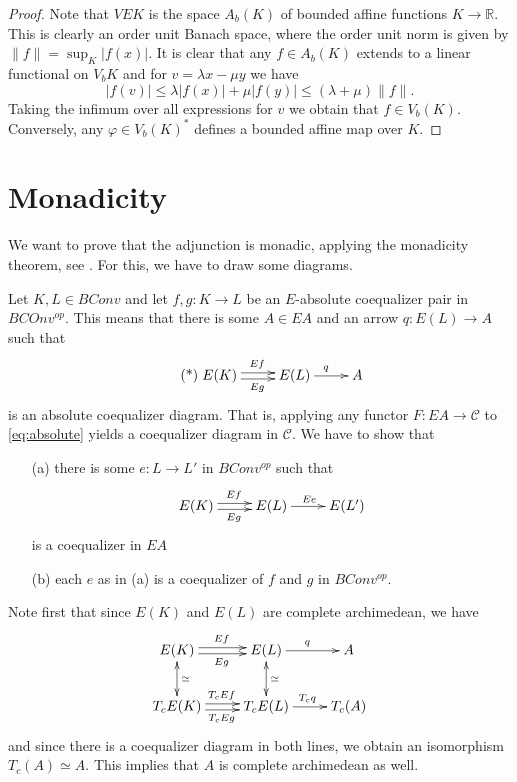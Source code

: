 \documentclass[12pt]{article}
\begin{document}
\begin{proof} Note that $VEK$ is the space $A_b(K)$ of bounded affine functions $K\to \mathbb R$. This is clearly an order unit Banach space, where the order unit norm is given by $\|f\|=\sup_K|f(x)|$. It is clear that any $f\in A_b(K)$ 
extends to a linear functional on $V_bK$ and for $v=\lambda x-\mu y$ we have
\[
|f(v)|\le \lambda|f(x)|+\mu|f(y)|\le (\lambda+\mu)\|f\|.
\]
Taking the infimum over all expressions for $v$ we obtain that $f\in V_b(K)$. Conversely, any $\varphi\in V_b(K)^*$ defines a 
 bounded affine map over $K$.

\end{proof}

\section{Monadicity}

We want to prove that the adjunction is monadic, applying the monadicity theorem, see \cite{leinster}. For this, we have to draw some diagrams.

Let $K,L\in BConv$ and let $f,g:K\to L$ be an $E$-absolute coequalizer pair in $BCOnv^{op}$. This means that there is some $A\in EA$ and an arrow $q:E(L)\to A$ such that
\begin{equation}\label{eq:absolute}\tag{*}
\xymatrix{
E(K) \ar@<.5ex>[r]^{Ef} \ar@<-.5ex>[r]_{Eg} &E(L)\ar[r]^q & A}
\end{equation}
is an absolute coequalizer diagram. That is, applying any functor $F: EA\to \mathcal C$ to \eqref{eq:absolute} yields a coequalizer diagram in $\mathcal C$. We have to show that
\begin{enumerate}
\item[(a)] there is some $e: L\to L'$ in $BConv^{op}$ such that 
\begin{equation}
\xymatrix{
E(K) \ar@<.5ex>[r]^{Ef} \ar@<-.5ex>[r]_{Eg} &E(L)\ar[r]^{Ee} & E(L')}
\end{equation}
is a coequalizer in $EA$
\item[(b)] each $e$ as in (a) is a coequalizer of $f$ and $g$ in $BConv^{op}$.
\end{enumerate}

Note first that since $E(K)$ and $E(L)$ are complete archimedean, we have 
\[
\xymatrix{
E(K) \ar@<.5ex>[r]^{Ef} \ar@<-.5ex>[r]_{Eg} \ar@{<->}^{\simeq}[d]&E(L)\ar[r]^q \ar@{<->}^\simeq[d]& A\\
T_cE(K)\ar@<.5ex>[r]^{T_cEf} \ar@<-.5ex>[r]_{T_cEg} &T_cE(L)\ar[r]^{T_cq}& T_c(A) }
\]
and since there is a coequalizer diagram in both lines, we obtain an isomorphism $T_c(A)\simeq A$. This implies that 
 $A$ is complete archimedean as well.
\end{document}
